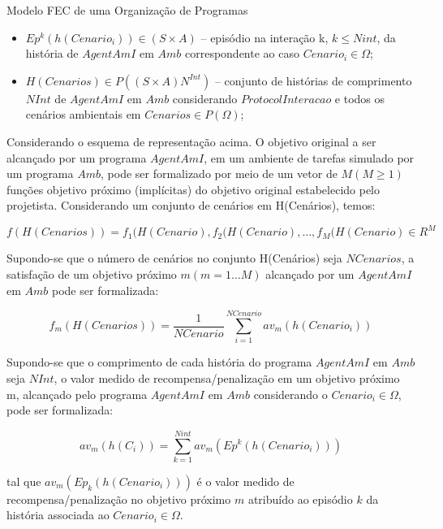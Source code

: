 \begin{section}{Modelo FEC de uma Organização de Programas}
\begin{itemize}
        \item $Ep^k(h(Cenario_i)) \in (S\times A)$ -- episódio na interação k, $k \leq Nint$, da história de $AgentAmI$ em $Amb$ correspondente ao caso $Cenario_i \in \Omega$;
    
        \item $H(Cenarios) \in P((S\times A)N^{Int})$ -- conjunto de histórias de comprimento $NInt$ de $AgentAmI$ em $Amb$ considerando $ProtocolInteracao$ e todos os cenários ambientais em $Cenarios \in P(\Omega)$;
    \end{itemize}
    
    Considerando o esquema de representação acima. O objetivo original a ser alcançado por um programa $AgentAmI$, em um ambiente de tarefas simulado por um programa $Amb$, pode ser formalizado por meio de um vetor de $M (M \geq 1)$ funções objetivo próximo (implícitas) do objetivo original estabelecido pelo projetista. Considerando um conjunto de cenários em H(Cenários), temos:

    \begin{equation}\label{eq:func-cen}
        f(H(Cenarios)) = f_1(H(Cenario), f_2(H(Cenario), \ldots, f_M(H(Cenario) \in R^M
    \end{equation}
        
    Supondo-se que o número de cenários no conjunto H(Cenários) seja $NCenarios$, a satisfação de um objetivo próximo $m (m = 1 \ldots M)$ alcançado por um $AgentAmI$ em $Amb$ pode ser formalizada:

    \begin{equation}\label{eq:func-cen-media}
        f_m(H(Cenarios)) = \frac{1}{NCenario} \sum_{i=1}^{NCenario} av_m(h(Cenario_i))
    \end{equation}

    Supondo-se que o comprimento de cada história do programa $AgentAmI$ em $Amb$ seja $NInt$, o valor medido de recompensa/penalização em um objetivo próximo m, alcançado pelo programa $AgentAmI$ em $Amb$ considerando o $Cenario_i \in \Omega$, pode ser formalizada: 
        
    \begin{equation}\label{eq:func-av}
        av_m(h(C_i)) = \sum_{k=1}^{Nint} av_m(Ep^k(h(Cenario_i)))
    \end{equation}
    
    tal que $av_m(Ep_k(h(Cenario_i)))$ é o valor medido de recompensa/penalização no objetivo próximo $m$ atribuído ao episódio $k$ da história associada ao $Cenario_i \in \Omega$. 
    

\end{section}
